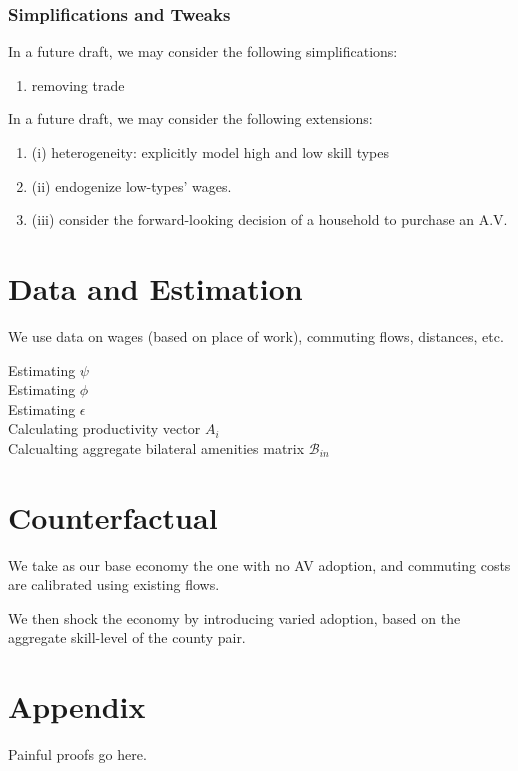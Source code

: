 \documentclass{article}
\begin{document}
\subsubsection{Simplifications and Tweaks}

In a future draft, we may consider the following simplifications: 

\begin{enumerate}
\item removing trade
\end{enumerate}

In a future draft, we may consider the following extensions: 
\begin{enumerate}
\item  (i) heterogeneity: explicitly model high and low skill types
 \item (ii) endogenize low-types' wages.
\item (iii) consider the forward-looking decision of a household to purchase an A.V.
\end{enumerate}



\section{Data and Estimation}
We use data on wages (based on place of work), commuting flows, distances, etc.



Estimating $\psi$ \\
Estimating $\phi$ \\ 
Estimating $\epsilon$ \\
Calculating productivity vector $A_i$ \\
Calcualting aggregate bilateral amenities matrix $\mathcal{B}_{in}$ \\




\section{Counterfactual}

We take as our base economy the one with no AV adoption, and commuting costs are calibrated using existing flows.

We then shock the economy by introducing varied adoption, based on the aggregate skill-level of the county pair.


\section{Appendix}
Painful proofs go here.


\end{document}

